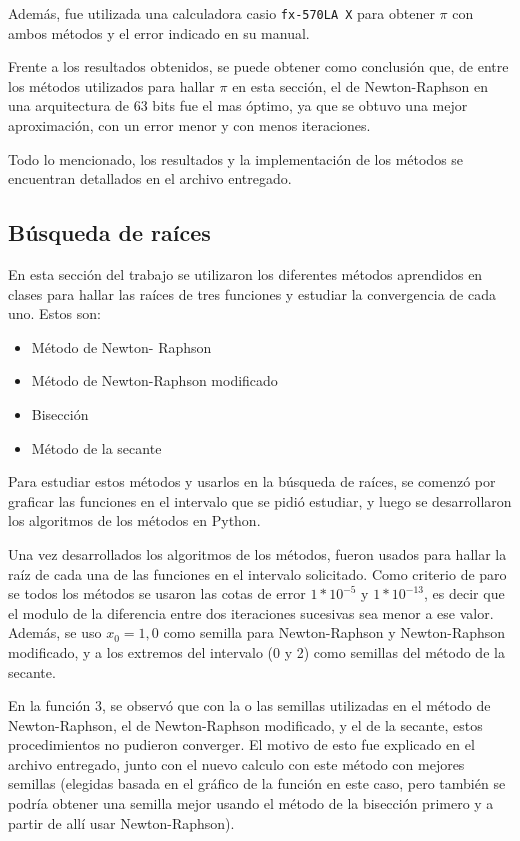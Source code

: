 \documentclass[titlepage,a4paper]{article}
\begin{document}
Además, fue utilizada una calculadora casio \verb|fx-570LA X| para obtener $\pi$ con ambos métodos y el error indicado en su manual.

Frente a los resultados obtenidos, se puede obtener como conclusión que, de entre los métodos utilizados para hallar $\pi$ en esta sección, el de Newton-Raphson en una arquitectura de 63 bits fue el mas óptimo, ya que se obtuvo una mejor aproximación, con un error menor y con menos iteraciones.

Todo lo mencionado, los resultados y la implementación de los métodos se encuentran detallados en el archivo entregado.


\subsection{Búsqueda de raíces}
En esta sección del trabajo se utilizaron los diferentes métodos aprendidos en clases para hallar las raíces de tres funciones y estudiar la convergencia de cada uno.
Estos son:
\begin{itemize}
    \item Método de Newton- Raphson
    \item Método de Newton-Raphson modificado
    \item Bisección
    \item Método de la secante
\end{itemize}
Para estudiar estos métodos y usarlos en la búsqueda de raíces, se comenzó por graficar las funciones en el intervalo que se pidió estudiar, y luego se desarrollaron los algoritmos de los métodos en Python.

Una vez desarrollados los algoritmos de los métodos, fueron usados para hallar la raíz de cada una de las funciones en el intervalo solicitado. Como criterio de paro se todos los métodos se usaron las cotas de error $1*10^{-5}$ y $1*10^{-13}$, es decir que el modulo de la diferencia entre dos iteraciones sucesivas sea menor a ese valor. Además, se uso $x_0=1,0$ como semilla para Newton-Raphson y Newton-Raphson modificado, y a los extremos del intervalo (0 y 2) como semillas del método de la secante.

En la función 3, se observó que con la o las semillas utilizadas en el método de Newton-Raphson, el de Newton-Raphson modificado, y el de la secante, estos procedimientos no pudieron converger. El motivo de esto fue explicado en el archivo entregado, junto con el nuevo calculo con este método con mejores semillas (elegidas basada en el gráfico de la función en este caso, pero también se podría obtener una semilla mejor usando el método de la bisección primero y a partir de allí usar Newton-Raphson).
\end{document}
